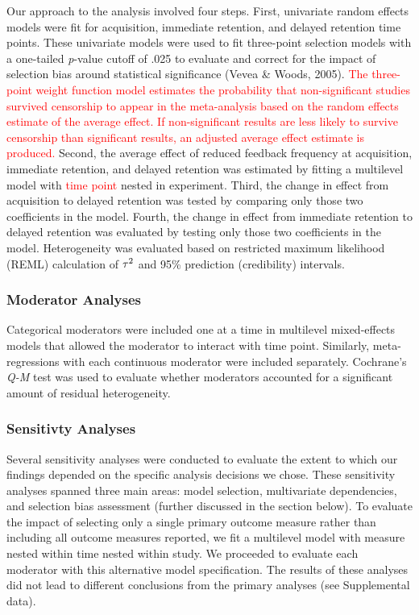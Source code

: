\documentclass[
  english,
  man, donotrepeattitle,mask,floatsintext]{apa7}
\begin{document}
Our approach to the analysis involved four steps. First, univariate random effects models were fit for acquisition, immediate retention, and delayed retention time points. These univariate models were used to fit three-point selection models with a one-tailed \emph{p}-value cutoff of .025 to evaluate and correct for the impact of selection bias around statistical significance (Vevea \& Woods, 2005). \textcolor{red}{The three-point weight function model estimates the probability that non-significant studies survived censorship to appear in the meta-analysis based on the random effects estimate of the average effect. If non-significant results are less likely to survive censorship than significant results, an adjusted average effect estimate is produced.} Second, the average effect of reduced feedback frequency at acquisition, immediate retention, and delayed retention was estimated by fitting a multilevel model with \textcolor{red}{time point} nested in experiment. Third, the change in effect from acquisition to delayed retention was tested by comparing only those two coefficients in the model. Fourth, the change in effect from immediate retention to delayed retention was evaluated by testing only those two coefficients in the model. Heterogeneity was evaluated based on restricted maximum likelihood (REML) calculation of \(\small\tau^2\) and 95\% prediction (credibility) intervals.

\hypertarget{moderator-analyses}{%
\subsubsection{Moderator Analyses}\label{moderator-analyses}}

Categorical moderators were included one at a time in multilevel mixed-effects models that allowed the moderator to interact with time point. Similarly, meta-regressions with each continuous moderator were included separately. Cochrane's \emph{Q-M} test was used to evaluate whether moderators accounted for a significant amount of residual heterogeneity.

\hypertarget{sensitivty-analyses}{%
\subsubsection{Sensitivty Analyses}\label{sensitivty-analyses}}

Several sensitivity analyses were conducted to evaluate the extent to which our findings depended on the specific analysis decisions we chose. These sensitivity analyses spanned three main areas: model selection, multivariate dependencies, and selection bias assessment (further discussed in the section below). To evaluate the impact of selecting only a single primary outcome measure rather than including all outcome measures reported, we fit a multilevel model with measure nested within time nested within study. We proceeded to evaluate each moderator with this alternative model specification. The results of these analyses did not lead to different conclusions from the primary analyses (see Supplemental data).
\end{document}
